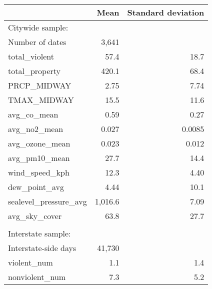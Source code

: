 \begingroup
\setlength{}
\setlength{}\fontsize{10.0pt}{12.0pt}\selectfont
\begin{longtable}{@{\extracolsep{\fill}}lrr}
\toprule
 & Mean & Standard deviation \\ 
\midrule\addlinespace[2.5pt]
Citywide sample: &  &  \\ 
Number of dates & 3,641 &  \\ 
total\_violent & 57.4 & 18.7 \\ 
total\_property & 420.1 & 68.4 \\ 
PRCP\_MIDWAY & 2.75 & 7.74 \\ 
TMAX\_MIDWAY & 15.5 & 11.6 \\ 
avg\_co\_mean & 0.59 & 0.27 \\ 
avg\_no2\_mean & 0.027 & 0.0085 \\ 
avg\_ozone\_mean & 0.023 & 0.012 \\ 
avg\_pm10\_mean & 27.7 & 14.4 \\ 
wind\_speed\_kph & 12.3 & 4.40 \\ 
dew\_point\_avg & 4.44 & 10.1 \\ 
sealevel\_pressure\_avg & 1,016.6 & 7.09 \\ 
avg\_sky\_cover & 63.8 & 27.7 \\ 
 &  &  \\ 
Interstate sample: &  &  \\ 
Interstate-side days & 41,730 &  \\ 
violent\_num & 1.1 & 1.4 \\ 
nonviolent\_num & 7.3 & 5.2 \\ 
\bottomrule
\end{longtable}
\endgroup

